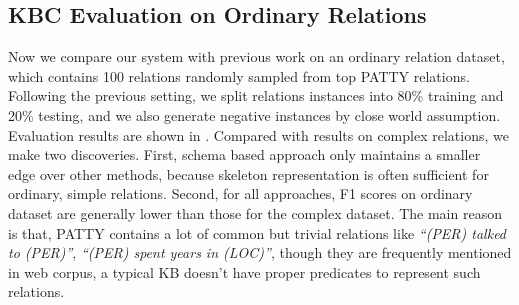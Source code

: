 \subsection{KBC Evaluation on Ordinary Relations}
Now we compare our system with previous work on an ordinary relation dataset, which
contains 100 relations randomly sampled from top PATTY relations.
Following the previous setting, we split relations instances into 
80\% training and 20\% testing, and we also generate negative instances by close world assumption.
Evaluation results are shown in .
Compared with results on complex relations, we make two discoveries.
First, schema based approach only maintains a smaller edge over other methods,
because skeleton representation is often sufficient for ordinary, simple relations.
Second, for all approaches, F1 scores on ordinary dataset are generally
lower than those for the complex dataset.
The main reason is that, PATTY contains a lot of common but trivial relations
like \textit{``(PER) talked to (PER)''},
\textit{``(PER) spent years in (LOC)''},
though they are frequently mentioned in web corpus,
a typical KB doesn't have proper predicates to represent such relations.



